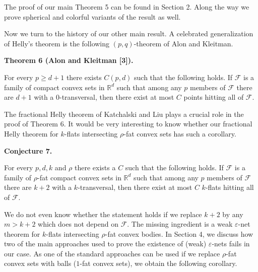 \par
\par
The proof of our main Theorem 5 can be found in Section 2. Along the way we prove spherical and colorful variants of the result as well.
\par
\par
Now we turn to the history of our other main result. A celebrated generalization of Helly’s theorem is the following $(p,q)$-theorem of Alon and Kleitman.
\par
\par
\par\medskip\noindent\textbf{Theorem 6 (Alon and Kleitman [3]).}\par
For every $p\geq d+1$ there exists $C(p,d)$ such that the following holds. If $\mathcal{F}$ is a family of compact convex sets in $\mathbb{R}^{d}$ such that among any $p$ members of $\mathcal{F}$ there are $d+1$ with a $0$-transversal, then there exist at most $C$ points hitting all of $\mathcal{F}$.
\par
\par
\par
The fractional Helly theorem of Katchalski and Liu plays a crucial role in the proof of Theorem 6. It would be very interesting to know whether our fractional Helly theorem for $k$-flats intersecting $\rho$-fat convex sets has such a corollary.
\par
\par
\par\medskip\noindent\textbf{Conjecture 7.}\par
For every $p,d,k$ and $\rho$ there exists a $C$ such that the following holds. If $\mathcal{F}$ is a family of $\rho$-fat compact convex sets in $\mathbb{R}^{d}$ such that among any $p$ members of $\mathcal{F}$ there are $k+2$ with a $k$-transversal, then there exist at most $C$ $k$-flats hitting all of $\mathcal{F}$.
\par
\par
\par
We do not even know whether the statement holds if we replace $k+2$ by any $m>k+2$ which does not depend on $\mathcal{F}$. The missing ingredient is a weak $\varepsilon$-net theorem for $k$-flats intersecting $\rho$-fat convex bodies. In Section 4, we discuss how two of the main approaches used to prove the existence of (weak) $\varepsilon$-nets fails in our case. As one of the standard approaches can be used if we replace $\rho$-fat convex sets with balls ($1$-fat convex sets), we obtain the following corollary.
